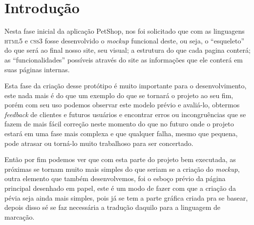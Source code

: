 \chapter{Introdução}

Nesta fase inicial da aplicação PetShop, nos foi solicitado que com as
linguagens \textsc{html5} e \textsc{css3} fosse desenvolvido o \emph{mockup}
funcional deste, ou seja, o “esqueleto” do que será ao final nosso site,
seu visual; a estrutura do que cada pagina conterá; as “funcionalidades”
possíveis através do site as informações que ele conterá em suas páginas
internas.

Esta fase da criação desse protótipo é muito importante para o desenvolvimento,
este nada mais é do que um exemplo do que se tornará o projeto ao seu fim,
porém com seu uso podemos observar este modelo prévio e avaliá-lo, obtermos
\emph{feedback} de clientes e futuros usuários e encontrar erros ou incongruências
que se fazem de mais fácil correção neste momento do que no futuro onde o
projeto estará em uma fase mais complexa e que qualquer falha, mesmo que
pequena, pode atrasar ou torná-lo muito trabalhoso para ser concertado.

Então por fim podemos ver que com esta parte do projeto bem executada, as
próximas se tornam muito mais simples do que seriam se a criação do \emph{mockup},
outra elemento que também desenvolvemos, foi o esboço prévio da página
principal desenhado em papel, este é um modo de fazer com que a criação da
pévia seja ainda mais simples, pois já se tem a parte gráfica criada pra se
basear, depois disso sé se faz necessária a tradução daquilo para a linguagem
de marcação.